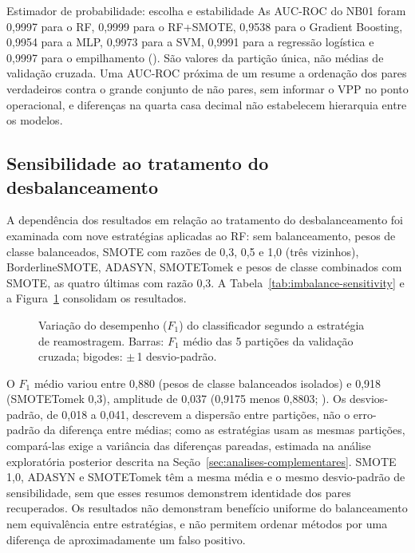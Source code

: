 \begin{chapter}{Estimador de probabilidade: escolha e estabilidade}
As AUC-ROC do NB01 foram 0,9997 para o RF, 0,9999 para o RF+SMOTE, 0,9538 para o Gradient Boosting, 0,9954 para a MLP, 0,9973 para a SVM, 0,9991 para a regressão logística e 0,9997 para o empilhamento (). São valores da partição única, não médias de validação cruzada. Uma AUC-ROC próxima de um resume a ordenação dos pares verdadeiros contra o grande conjunto de não pares, sem informar o VPP no ponto operacional, e diferenças na quarta casa decimal não estabelecem hierarquia entre os modelos.

\sloppy
\subsection{Sensibilidade ao tratamento do desbalanceamento}
\fussy
\label{sec:e2-robustez}

A dependência dos resultados em relação ao tratamento do desbalanceamento foi examinada com nove estratégias aplicadas ao RF: sem balanceamento, pesos de classe balanceados, SMOTE com razões de 0,3, 0,5 e 1,0 (três vizinhos), BorderlineSMOTE, ADASYN, SMOTETomek e pesos de classe combinados com SMOTE, as quatro últimas com razão 0,3. A Tabela~\ref{tab:imbalance-sensitivity} e a Figura~\ref{fig:imbalance-sensitivity} consolidam os resultados.



\begin{figure}[!ht]
\centering
\resizebox{0.92\textwidth}{!}{}
\caption{Variação do desempenho ($F_1$) do classificador segundo a estratégia de reamostragem. Barras: $F_1$ médio das 5 partições da validação cruzada; bigodes: $\pm$\,1 desvio-padrão.}
\label{fig:imbalance-sensitivity}
\end{figure}

O $F_1$ médio variou entre 0,880 (pesos de classe balanceados isolados) e 0,918 (SMOTETomek 0,3), amplitude de 0,037 (0,9175 menos 0,8803; ). Os desvios-padrão, de 0,018 a 0,041, descrevem a dispersão entre partições, não o erro-padrão da diferença entre médias; como as estratégias usam as mesmas partições, compará-las exige a variância das diferenças pareadas, estimada na análise exploratória posterior descrita na Seção~\ref{sec:analises-complementares}. SMOTE 1,0, ADASYN e SMOTETomek têm a mesma média e o mesmo desvio-padrão de sensibilidade, sem que esses resumos demonstrem identidade dos pares recuperados. Os resultados não demonstram benefício uniforme do balanceamento nem equivalência entre estratégias, e não permitem ordenar métodos por uma diferença de aproximadamente um falso positivo.


\end{chapter}
